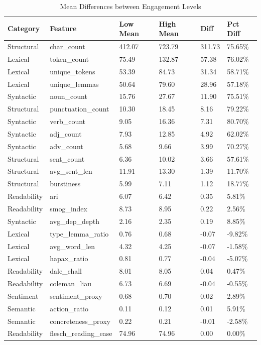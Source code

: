 \documentclass[12pt]{article}
\begin{document}
\begin{longtable}{llllll}
\caption{Mean Differences between Engagement Levels} \\
\textbf{Category} & \textbf{Feature} & \textbf{Low Mean} & \textbf{High Mean} & \textbf{Diff} & \textbf{Pct Diff} \\
\hline
Structural & char\_count & 412.07 & 723.79 & 311.73 & 75.65\% \\
Lexical & token\_count & 75.49 & 132.87 & 57.38 & 76.02\% \\
Lexical & unique\_tokens & 53.39 & 84.73 & 31.34 & 58.71\% \\
Lexical & unique\_lemmas & 50.64 & 79.60 & 28.96 & 57.18\% \\
Syntactic & noun\_count & 15.76 & 27.67 & 11.90 & 75.51\% \\
Structural & punctuation\_count & 10.30 & 18.45 & 8.16 & 79.22\% \\
Syntactic & verb\_count & 9.05 & 16.36 & 7.31 & 80.70\% \\
Syntactic & adj\_count & 7.93 & 12.85 & 4.92 & 62.02\% \\
Syntactic & adv\_count & 5.68 & 9.66 & 3.99 & 70.27\% \\
Structural & sent\_count & 6.36 & 10.02 & 3.66 & 57.61\% \\
Structural & avg\_sent\_len & 11.91 & 13.30 & 1.39 & 11.70\% \\
Structural & burstiness & 5.99 & 7.11 & 1.12 & 18.77\% \\
Readability & ari & 6.07 & 6.42 & 0.35 & 5.81\% \\
Readability & smog\_index & 8.73 & 8.95 & 0.22 & 2.56\% \\
Syntactic & avg\_dep\_depth & 2.16 & 2.35 & 0.19 & 8.85\% \\
Lexical & type\_lemma\_ratio & 0.76 & 0.68 & -0.07 & -9.82\% \\
Lexical & avg\_word\_len & 4.32 & 4.25 & -0.07 & -1.58\% \\
Lexical & hapax\_ratio & 0.81 & 0.77 & -0.04 & -5.07\% \\
Readability & dale\_chall & 8.01 & 8.05 & 0.04 & 0.47\% \\
Readability & coleman\_liau & 6.73 & 6.69 & -0.04 & -0.55\% \\
Sentiment & sentiment\_proxy & 0.68 & 0.70 & 0.02 & 2.89\% \\
Semantic & action\_ratio & 0.11 & 0.12 & 0.01 & 5.91\% \\
Semantic & concreteness\_proxy & 0.22 & 0.21 & -0.01 & -2.58\% \\
Readability & flesch\_reading\_ease & 74.96 & 74.96 & 0.00 & 0.00\% \\
\end{longtable}
\end{document}
